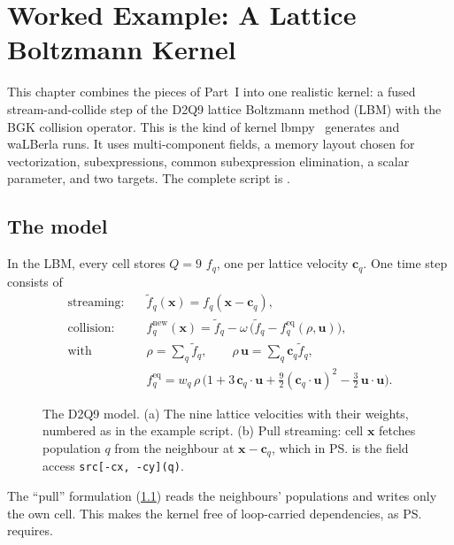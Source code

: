 \chapter{Worked Example: A Lattice Boltzmann Kernel}\label{ch:worked-example}

This chapter combines the pieces of Part~I into one realistic kernel: a fused
stream-and-collide step of the D2Q9 lattice Boltzmann method (LBM) with the BGK
collision operator. This is the kind of kernel lbmpy~\cite{lbmpy} generates and waLBerla
runs. It uses multi-component fields, a memory layout chosen for vectorization,
subexpressions, common subexpression elimination, a scalar parameter, and two targets.
The complete script is .

\section{The model}

In the LBM, every cell stores $Q=9$  $f_q$, one per lattice velocity
$\mathbf c_q$. One time step consists of
\begin{align*}
  \text{streaming:}\quad & \tilde f_q(\mathbf x) = f_q(\mathbf x - \mathbf c_q),\\
  \text{collision:}\quad & f_q^{\text{new}}(\mathbf x) = \tilde f_q - \omega\,\bigl(\tilde f_q - f_q^{\text{eq}}(\rho, \mathbf u)\bigr),\\
  \text{with}\quad & \rho = \sum_q \tilde f_q,\qquad \rho\,\mathbf u = \sum_q \mathbf c_q \tilde f_q,\\
  & f_q^{\text{eq}} = w_q\,\rho\,\bigl(1 + 3\,\mathbf c_q\!\cdot\!\mathbf u + \tfrac92 (\mathbf c_q\!\cdot\!\mathbf u)^2 - \tfrac32\,\mathbf u\!\cdot\!\mathbf u\bigr).
\end{align*}

\begin{figure}[htbp]
  \centering
  
  \caption[The D2Q9 model and pull streaming]{The D2Q9 model. (a) The nine lattice velocities with their weights, numbered as in the example script. (b) Pull streaming: cell $\mathbf x$ fetches population $q$ from the neighbour at $\mathbf x-\mathbf c_q$, which in \ps{} is the field access \texttt{src[-cx, -cy](q)}.}
  \label{fig:d2q9}
\end{figure}

The ``pull'' formulation (\cref{fig:d2q9}) reads the neighbours' populations and writes
only the own cell.
This makes the kernel free of loop-carried dependencies, as \ps{} requires.

